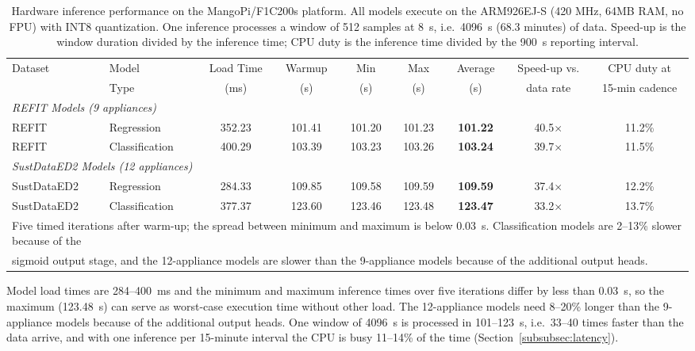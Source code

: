 \documentclass[fleqn,10pt]{wlscirep}
\begin{document}
\begin{table}[!t]
\centering
\caption{Hardware inference performance on the MangoPi/F1C200s platform. All models execute on the ARM926EJ-S (420 MHz, 64MB RAM, no FPU) with INT8 quantization. One inference processes a window of 512 samples at 8~s, i.e.\ 4096~s (68.3 minutes) of data. Speed-up is the window duration divided by the inference time; CPU duty is the inference time divided by the 900~s reporting interval.}
\label{tab:hardware_inference_results}
\footnotesize
\begin{tabular}{@{}llccccccc@{}}
\toprule
Dataset & Model & Load Time & Warmup & Min & Max & Average & Speed-up vs. & CPU duty at \\
 & Type & (ms) & (s) & (s) & (s) & (s) & data rate & 15-min cadence \\
\midrule
\multicolumn{9}{l}{\textit{REFIT Models (9 appliances)}} \\
REFIT & Regression & 352.23 & 101.41 & 101.20 & 101.23 & \textbf{101.22} & 40.5$\times$ & 11.2\% \\
REFIT & Classification & 400.29 & 103.39 & 103.23 & 103.26 & \textbf{103.24} & 39.7$\times$ & 11.5\% \\
\midrule
\multicolumn{9}{l}{\textit{SustDataED2 Models (12 appliances)}} \\
SustDataED2 & Regression & 284.33 & 109.85 & 109.58 & 109.59 & \textbf{109.59} & 37.4$\times$ & 12.2\% \\
SustDataED2 & Classification & 377.37 & 123.60 & 123.46 & 123.48 & \textbf{123.47} & 33.2$\times$ & 13.7\% \\
\bottomrule
\multicolumn{9}{l}{\footnotesize Five timed iterations after warm-up; the spread between minimum and maximum is below 0.03~s. Classification models are 2--13\% slower because of the} \\
\multicolumn{9}{l}{\footnotesize sigmoid output stage, and the 12-appliance models are slower than the 9-appliance models because of the additional output heads.}
\end{tabular}
\end{table}

Model load times are 284--400~ms and the minimum and maximum inference times over five iterations differ by less than 0.03~s, so the maximum (123.48~s) can serve as worst-case execution time without other load. The 12-appliance models need 8--20\% longer than the 9-appliance models because of the additional output heads. One window of 4096~s is processed in 101--123~s, i.e.\ 33--40 times faster than the data arrive, and with one inference per 15-minute interval the CPU is busy 11--14\% of the time (Section~\ref{subsubsec:latency}).
\end{document}
